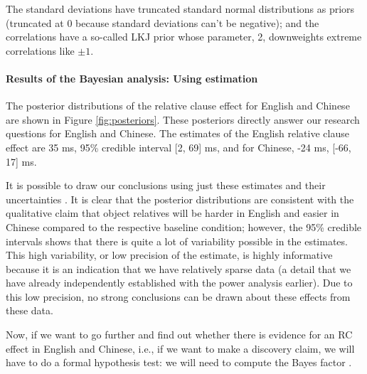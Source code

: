 \documentclass{ar-1col}\usepackage[]{graphicx}\usepackage[]{color}
\begin{document}
The standard deviations have truncated standard normal distributions as priors (truncated at 0 because standard deviations can't be negative); and the correlations have a so-called LKJ prior whose parameter, 2, downweights extreme correlations like $\pm 1$.













\paragraph{Results of the Bayesian analysis: Using estimation}


The posterior distributions of the relative clause effect for English and Chinese are shown in Figure \ref{fig:posteriors}. These posteriors directly answer our research questions for English and Chinese.  The estimates of the English relative clause effect are 35 ms, 95\% credible interval [2, 69] ms, and for Chinese,
-24 ms, [-66, 17] ms.

It is possible to draw our conclusions using just these estimates and their uncertainties  \citep{kruschke2010believe,kruschke2018bayesian}.
It is clear that the posterior distributions are consistent with the qualitative claim that object relatives will be harder in English and easier in Chinese compared to the respective baseline condition; however, the 95\% credible intervals shows that there is quite a lot of variability possible in the estimates. This high variability, or low precision of the estimate, is highly informative because it is an indication that we have relatively sparse data (a detail that we have already independently established with the power analysis earlier). Due to this low precision, no strong conclusions can be drawn about these effects from these data.

Now, if we want to go further and find out whether there is evidence for an RC effect in English and Chinese, i.e., if we want to make a discovery claim, we will have to do a formal hypothesis test: we will need to compute the Bayes factor  \citep{kass1995bayes}.
\end{document}
